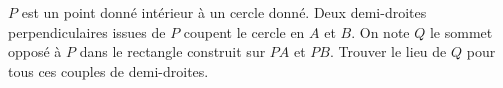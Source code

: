 $P$ est un point donné intérieur à un cercle donné. Deux demi-droites perpendiculaires issues de $P$ coupent le cercle en $A$ et $B$. On note $Q$ le sommet opposé à $P$ dans le rectangle construit sur $PA$ et $PB$. Trouver le lieu de $Q$ pour tous ces couples de demi-droites.
